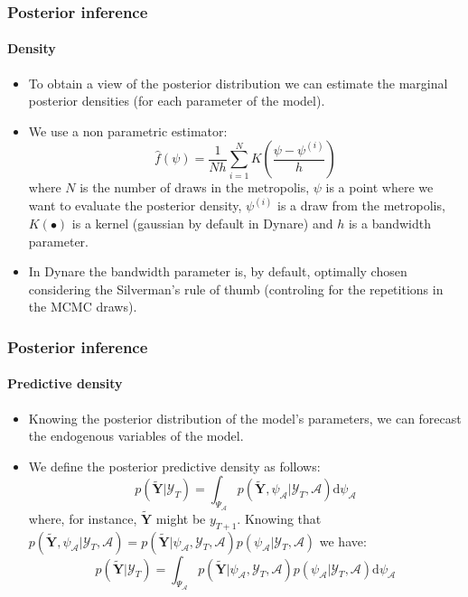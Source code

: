 \documentclass[10pt,slidestop]{beamer}
\newcommand{\sample}{\mathcal Y_T}
\begin{document}
\begin{frame}
  \frametitle{Posterior inference}
  \framesubtitle{Density}

    \begin{itemize}

    \item To obtain a view of the posterior distribution we can
    estimate the marginal posterior densities (for each parameter of the model).

\bigskip

    \item We use a non parametric estimator:
    {\tiny
    \[
        \hat{f}(\psi) = \frac{1}{Nh}\sum_{i=1}^N K\left(\frac{\psi-\psi^{(i)}}{h}\right)
    \]
    }
    where $N$ is the number of draws in the metropolis, $\psi$ is
    a  point where we want to evaluate the posterior density,
    $\psi^{(i)}$ is a draw from the metropolis, $K(\bullet)$ is a
    kernel (gaussian by default in Dynare) and $h$ is a bandwidth
    parameter.

\bigskip

    \item In Dynare the bandwidth parameter is, by default, optimally
    chosen considering the Silverman's rule of thumb (controling for
    the repetitions in the MCMC draws).
    \end{itemize}

\end{frame}


\begin{frame}
  \frametitle{Posterior inference}
  \framesubtitle{Predictive density}

    \begin{itemize}

    \item Knowing the posterior distribution of the model's
    parameters, we can forecast the endogenous variables of the
    model.

\bigskip

    \item We define the posterior predictive density as follows:
    \[
p({\tilde{\mathbf Y}}|\sample) = \int_{\Psi_{\mathcal A}}
p(\tilde{\mathbf Y}, \psi_{\mathcal A}|\sample, \mathcal A)\mathrm d\psi_{\mathcal A}
    \]
    where, for instance, $\tilde{\mathbf Y}$ might be $y_{T+1}$.
    Knowing that $p(\tilde{\mathbf Y}, \psi_{\mathcal A}|\sample, \mathcal A) = p(\tilde{\mathbf Y}|
\psi_{\mathcal A},\sample, \mathcal A)p(\psi_{\mathcal A}|\sample,\mathcal A)$
    we have:
  \[
    p({\tilde{\mathbf Y}}|\sample)
    = \int_{\Psi_{\mathcal A}} p(\tilde{\mathbf Y}| \psi_{\mathcal A},\sample,
\mathcal A)p(\psi_{\mathcal A}|\sample,\mathcal A)\mathrm d\psi_{\mathcal A}
  \]

  \end{itemize}
\end{frame}
\end{document}
